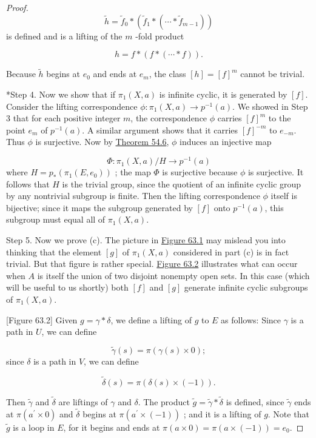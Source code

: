 \begin{proof}
\[
\tilde{h} = \tilde{f}_{0} * ( {\tilde{f}_{1} * ( {\cdots * \tilde{f}_{m - 1}}) })
\]
is defined and is a lifting of the \(m\) -fold product

\[
h = f * ( {f * ( {\cdots * f}) }).
\]

Because \(\tilde{h}\) begins at \(e_{0}\) and ends at \(e_{m}\), the class \([ h] = {[ f] }^{m}\) cannot be trivial.

*Step 4. Now we show that if \({\pi }_{1}( {X,a})\) is infinite cyclic, it is generated by \([ f]\). Consider the lifting correspondence \(\phi : {\pi }_{1}( {X,a}) \rightarrow {p}^{-1}( a)\). We showed in Step 3 that for each positive integer \(m\), the correspondence \(\phi\) carries \({[ f] }^{m}\) to the point \(e_{m}\) of \(p^{-1}( a)\). A similar argument shows that it carries \({[ f] }^{-m}\) to \(e_{-m}\). Thus \(\phi\) is surjective. Now by \hyperref[thm:54.6]{Theorem 54.6}, \(\phi\) induces an injective map

\[
\Phi : {\pi }_{1}( {X,a}) /H \rightarrow {p}^{-1}( a)
\]
where \(H = p_{ * }( {{\pi }_{1}( {E,e_{0}}) })\) ; the map \(\Phi\) is surjective because \(\phi\) is surjective. It follows that \(H\) is the trivial group, since the quotient of an infinite cyclic group by any nontrivial subgroup is finite. Then the lifting correspondence \(\phi\) itself is bijective; since it maps the subgroup generated by \([ f]\) onto \(p^{-1}( a)\), this subgroup must equal all of \({\pi }_{1}( {X,a})\).

Step 5. Now we prove (c). The picture in \hyperref[fig:63.1]{Figure 63.1} may mislead you into thinking that the element \([ g]\) of \({\pi }_{1}( {X,a})\) considered in part (c) is in fact trivial. But that figure is rather special. \hyperref[fig:63.2]{Figure 63.2} illustrates what can occur when \(A\) is itself the union of two disjoint nonempty open sets. In this case (which will be useful to us shortly) both \([ f]\) and \([ g]\) generate infinite cyclic subgroups of \({\pi }_{1}( {X,a})\).

[Figure 63.2]
Given \(g = \gamma * \delta\), we define a lifting of \(g\) to \(E\) as follows: Since \(\gamma\) is a path in \(U\), we can define

\[
\tilde{\gamma }( s) = \pi ( {\gamma ( s) \times 0}) ;
\]
since \(\delta\) is a path in \(V\), we can define

\[
\tilde{\delta }( s) = \pi ( {\delta ( s) \times ( {-1}) }).
\]

Then \(\tilde{\gamma }\) and \(\tilde{\delta }\) are liftings of \(\gamma\) and \(\delta\). The product \(\tilde{g} = \tilde{\gamma } * \tilde{\delta }\) is defined, since \(\tilde{\gamma }\) ends at \(\pi ( {a^{\prime } \times 0})\) and \(\tilde{\delta }\) begins at \(\pi ( {a^{\prime } \times ( {-1}) })\) ; and it is a lifting of \(g\). Note that \(\tilde{g}\) is a loop in \(E\), for it begins and ends at \(\pi ( {a \times 0}) = \pi ( {a \times ( {-1}) }) = e_{0}\).


\end{proof}
